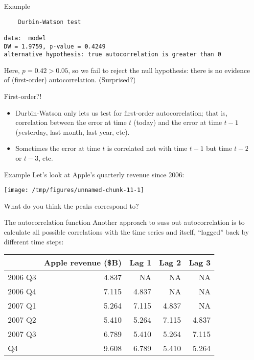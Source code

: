 \documentclass{beamer}\usepackage[]{graphicx}\usepackage[]{color}
\makeatletter
\def\maxwidth{ %
  \ifdim\Gin@nat@width>\linewidth
    \linewidth
  \else
    \Gin@nat@width
  \fi
}
\newenvironment{kframe}{%
 \def\at@end@of@kframe{}%
 \ifinner\ifhmode%
  \def\at@end@of@kframe{\end{minipage}}%
  \begin{minipage}{\columnwidth}%
 \fi\fi%
 \def\FrameCommand##1{\hskip\@totalleftmargin \hskip-\fboxsep
 \colorbox{shadecolor}{##1}\hskip-\fboxsep
     \hskip-\linewidth \hskip-\@totalleftmargin \hskip\columnwidth}%
 \MakeFramed {\advance\hsize-\width
   \@totalleftmargin\z@ \linewidth\hsize
   \@setminipage}}%
 {\par\unskip\endMakeFramed%
 \at@end@of@kframe}
\newenvironment{knitrout}{}{} %
\makeatother
\begin{document}
\begin{darkframes}
\begin{frame}[fragile]{Example}
\begin{knitrout}
\begin{kframe}
\begin{verbatim}
	Durbin-Watson test

data:  model
DW = 1.9759, p-value = 0.4249
alternative hypothesis: true autocorrelation is greater than 0
\end{verbatim}
\end{kframe}
\end{knitrout}
      Here, $p=0.42>0.05$, so we fail to reject the null hypothesis: there is no evidence of (first-order) autocorrelation. \pause (Surprised?)
    \end{frame}

    \begin{frame}{First-order?!}
      \begin{itemize}
        \item Durbin-Watson only lets us test for \alert{first-order} autocorrelation; that is, correlation between the error at time $t$ (today) and the error at time $t-1$ (yesterday, last month, last year, etc).
        \item Sometimes the error at time $t$ is correlated not with time $t-1$ but time $t-2$ or $t-3$, etc.
      \end{itemize}
    \end{frame}

    \begin{frame}[fragile]{Example}
      Let's look at Apple's quarterly revenue since 2006:

\begin{knitrout}
\color{fgcolor}
\texttt{[image: /tmp/figures/unnamed-chunk-11-1]} 

\end{knitrout}

      What do you think the peaks correspond to?
    \end{frame}

    \begin{frame}{The autocorrelation function}
      Another approach to suss out autocorrelation is to calculate all possible correlations with the time series and itself, ``lagged'' back by different time steps:

      \bigskip

      \begin{center}
\begin{knitrout}
\color{fgcolor}
\begin{tabular}{lrrrr}
\toprule
  & Apple revenue (\$B) & Lag 1 & Lag 2 & Lag 3\\
\midrule
2006 Q3 & 4.837 & NA & NA & NA\\
2006 Q4 & 7.115 & 4.837 & NA & NA\\
2007 Q1 & 5.264 & 7.115 & 4.837 & NA\\
2007 Q2 & 5.410 & 5.264 & 7.115 & 4.837\\
2007 Q3 & 6.789 & 5.410 & 5.264 & 7.115\\
\addlinespace
2007 Q4 & 9.608 & 6.789 & 5.410 & 5.264\\
\bottomrule
\end{tabular}



\end{knitrout}
\end{center}
\end{frame}
\end{darkframes}
\end{document}
